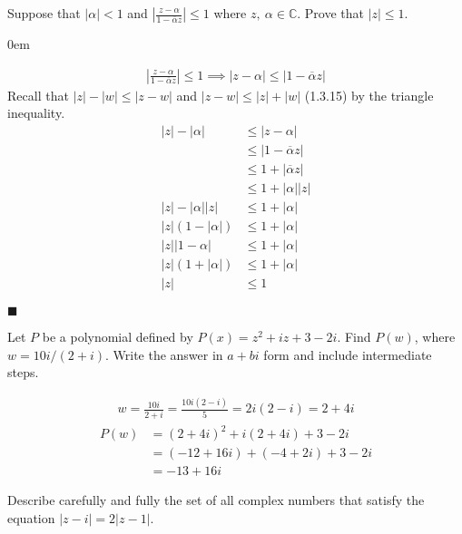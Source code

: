 \documentclass[12pt]{article}
\author{Warren Atkison}
\date{\today}
\renewcommand{\qed}{\hfill$\blacksquare$}
\renewenvironment{proof}{\vspace{0em}\begin{addmargin}[2em]{0em}\begin{newproof}}{\end{newproof}\end{addmargin}\qed}
\newenvironment{problem}[2][Problem]{\begin{trivlist}
\item[\hskip \labelsep {\bfseries #1} \hskip \labelsep {\bfseries #2.}]}{\end{trivlist}}
\begin{document}
\fancyhf{}
\fancyhead[R]{\today}
\fancyfoot[R]{\thepage}

\begin{problem}{1}
	Suppose that $|\alpha| < 1$ and $\left|\frac{z - \alpha}{1 - \overline{\alpha} z}\right| \le 1$ where $z,~\alpha \in \mathbb{C}$. Prove that $|z| \le 1$.
\end{problem}
\begin{proof}
	\begin{align*}
		\left|\frac{z - \alpha}{1 - \overline{\alpha} z}\right| \le 1 \implies |z - \alpha| \le |1 - \overline{\alpha} z|
	\end{align*}
 	Recall that $|z| - |w| \le |z - w|$ and $|z - w| \le |z| + |w|$ (1.3.15) by the triangle inequality.
	\begin{align*}
		|z| - |\alpha| &\le |z - \alpha| \\ 
			       &\le |1 - \overline{\alpha} z| \\ 
			       &\le 1 + |\overline{\alpha} z | \\  
			       &\le 1 + |\alpha| |z|\\ 
		|z| - |\alpha| |z| &\le 1 + |\alpha| \\
		|z|(1 - |\alpha|) &\le 1 + |\alpha| \\
		|z| |1 - \alpha| &\le 1 + |\alpha| \\
		|z|(1 + |\alpha|) &\le 1 + |\alpha| \\
		|z| &\le 1 
	\end{align*}
\end{proof}
\begin{problem}{2}
	Let $P$ be a polynomial defined by $P(x) = z^2 + iz + 3 - 2i$. Find $P(w)$, where $w = 10i/(2+i)$. Write the answer in $a + bi$ form and include intermediate steps.
\end{problem}	
\begin{align*}
	w = \frac{10i}{2 + i} = \frac{10i(2 - i)}{5} = 2i(2 - i) = 2 + 4i
\end{align*}
\begin{align*}
	P(w) &= (2 + 4i)^2 + i(2 + 4i) + 3 - 2i \\
	     &= (-12 + 16i) + (-4 + 2i) + 3 - 2i \\
	     &= -13 + 16i
\end{align*}
\begin{problem}{3}
	Describe carefully and fully the set of all complex numbers that satisfy the equation $|z - i| = 2|z - 1|$.
\end{problem}	
\end{document}
